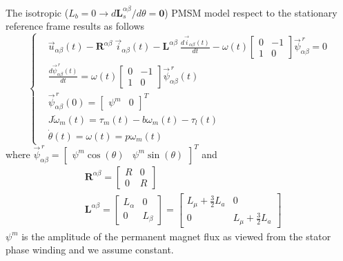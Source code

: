 \documentclass[11pt,a4paper]{article}
\numberwithin{equation}{section}
\theoremstyle{it}
\theoremstyle{definition}
\begin{document}
\begin{onehalfspace}
\begin{mybox}
	The isotropic ($L_b=0 \rightarrow d\mathbf{L}_s^{\alpha\beta}/d\theta=\mathbf{0}$) PMSM model respect to the stationary reference frame results as follows
	\begin{equation}\label{twophase_eq1tris}
		\left\lbrace \begin{aligned}
			& \vec{u}_{\alpha\beta}(t)-\mathbf{R}^{\alpha\beta}\ \vec{i}_{\alpha\beta}(t)-\mathbf{L}^{\alpha\beta}\ \frac{d\vec{i}_{\alpha\beta}(t)}{dt}-\omega(t) \begin{bmatrix} 0 & -1 \\ 1 & 0\end{bmatrix} \vec{\psi}^{\,r}_{\alpha\beta} = 0 \\[6pt]
			& \frac{d\vec{\psi}^{\,r}_{\alpha\beta}(t)}{dt} = \omega(t) \begin{bmatrix} 0 & -1 \\ 1 & 0\end{bmatrix} \vec{\psi}^{\,r}_{\alpha\beta}(t) \\[6pt]
			& \vec{\psi}^{\,r}_{\alpha\beta}(0) = \begin{bmatrix} \psi^m &  0 \end{bmatrix}^T \\[6pt]
			& J\dot{\omega}_m(t) = \tau_m(t)-b{\omega}_m(t)-\tau_l(t) \\[6pt]
			& \dot{\theta}(t) = \omega(t) = p\omega_m(t)
		\end{aligned} \right. 
	\end{equation}
	where $\vec{\psi}^{\,r}_{\alpha\beta} = \begin{bmatrix} \psi^m\cos(\theta) &  \psi^m\sin(\theta)\end{bmatrix}^T$ and
	\begin{equation*}
		\begin{aligned}
			& \mathbf{R}^{\alpha\beta} = 
			\begin{bmatrix} R &  0 \\
				0 & R
			\end{bmatrix} \\[6pt]
			& \mathbf{L}^{\alpha\beta} = 
			\begin{bmatrix} L_{\alpha} &  0 \\
				0 & L_{\beta}
			\end{bmatrix} = 
			\begin{bmatrix} L_\mu+\frac{3}{2}L_a &  0 \\
				0 & L_\mu+\frac{3}{2}L_a
			\end{bmatrix}
		\end{aligned} 
	\end{equation*}
	$\psi^m$ is the amplitude of the permanent magnet flux as viewed from the stator phase winding and we assume constant.
\end{mybox}


\end{onehalfspace}
\end{document}
